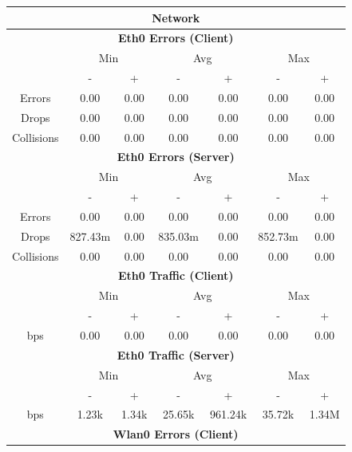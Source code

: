 \documentclass[11pt,a4paper]{scrreprt}
\begin{document}
\begin{table}[H]
\centering
    \begin{tabular}{||c|c|c|c|c|c|c||}
    \hline
    \multicolumn{7}{|c|}{\textbf{Network}} \\
    \hline
    \multicolumn{7}{|c|}{\textbf{Eth0 Errors (Client)}} \\
    \hline\hline
      & \multicolumn{2}{|c|}{Min} & \multicolumn{2}{|c|}{Avg} & \multicolumn{2}{|c|}{Max} \\
    \hline
     & - & + & - & + & - & + \\
    \hline
    Errors & 0.00 & 0.00 & 0.00 & 0.00 & 0.00 & 0.00 \\
    \hline
    Drops & 0.00 & 0.00 & 0.00 & 0.00 & 0.00 & 0.00 \\
    \hline
    Collisions & 0.00 & 0.00 & 0.00 & 0.00 & 0.00 & 0.00 \\
    \hline\hline
    \multicolumn{7}{|c|}{\textbf{Eth0 Errors (Server)}} \\
    \hline\hline
      & \multicolumn{2}{|c|}{Min} & \multicolumn{2}{|c|}{Avg} & \multicolumn{2}{|c|}{Max} \\
    \hline
     & - & + & - & + & - & + \\
    \hline
    Errors & 0.00 & 0.00 & 0.00 & 0.00 & 0.00 & 0.00 \\
    \hline
    Drops & 827.43m & 0.00 & 835.03m & 0.00 & 852.73m & 0.00 \\
    \hline
    Collisions & 0.00 & 0.00 & 0.00 & 0.00 & 0.00 & 0.00 \\
    \hline\hline
    \multicolumn{7}{|c|}{\textbf{Eth0 Traffic (Client)}} \\
    \hline\hline
      & \multicolumn{2}{|c|}{Min} & \multicolumn{2}{|c|}{Avg} & \multicolumn{2}{|c|}{Max} \\
    \hline
      & - & + & - & + & - & + \\
    \hline
    bps & 0.00 & 0.00 & 0.00 & 0.00 & 0.00 & 0.00 \\
    \hline\hline
    \multicolumn{7}{|c|}{\textbf{Eth0 Traffic (Server)}} \\
    \hline\hline
      & \multicolumn{2}{|c|}{Min} & \multicolumn{2}{|c|}{Avg} & \multicolumn{2}{|c|}{Max} \\
    \hline
      & - & + & - & + & - & + \\
    \hline
    bps & 1.23k & 1.34k & 25.65k & 961.24k & 35.72k & 1.34M \\
    \hline\hline
    \multicolumn{7}{|c|}{\textbf{Wlan0 Errors (Client)}} \\

\end{tabular}
\end{table}
\end{document}
